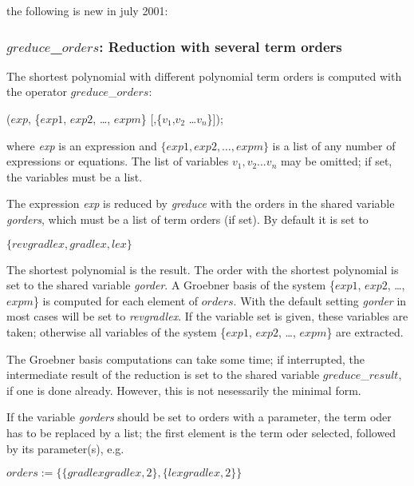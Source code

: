 the following is new in july 2001:

\subsubsection{$greduce$\_$orders$: Reduction with several term orders}
The shortest polynomial with different polynomial term orders is computed
with the operator $greduce$\_$orders$:
 
\begin{description}
\item[{\it greduce\_orders}]($exp$, \{$exp1$, $exp2$, \ldots , $expm$\}
[,\{$v_1$,$v_2$ \ldots $v_n$\}]);
 
where {\it exp} is an expression and $\{exp1, exp2,\ldots , expm\}$ is
a list of any number of expressions or equations. The list of variables
$v_1,v_2 \ldots v_n$ may be omitted; if set, the variables must be a list.
\end{description}
 
The expression {\it exp} is reduced by {\it greduce} with the orders
in the shared variable {\it gorders}, which must be a list of term
orders (if set). By default it is set to
 
\begin{center}
$\{revgradlex,gradlex,lex\}$
\end{center}
 
The shortest polynomial is the result.
The order with the shortest polynomial is set to the shared variable
{\it gorder}. A Groebner basis of the system \{$exp1$, $exp2$, \ldots ,
$expm$\} is computed for each element of $orders$.
With the default setting {\it gorder} in most cases will be set
to {\it revgradlex}.
If the variable set is given, these variables are taken; otherwise all
variables of the system \{$exp1$, $exp2$, \ldots , $expm$\} are
extracted.
 
The Groebner basis computations can take some time; if interrupted, the
intermediate result of the reduction is set to the shared variable
$greduce$\_$result$, if one is done already. However, this is not
nesessarily the minimal form.
 
If the variable {\it gorders} should be set to orders with a parameter,
the term oder has to be replaced by a list; the first element is the
term oder selected, followed by its parameter(s), e.g.
 
\begin{center}
$orders:=\{\{gradlexgradlex,2\},\{lexgradlex,2\}\}$
\end{center}
